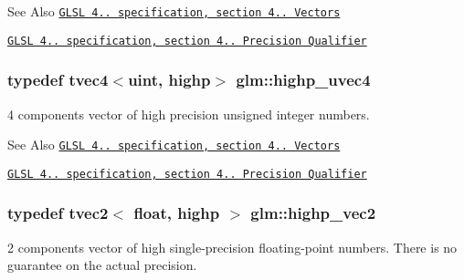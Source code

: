 \begin{DoxySeeAlso}{See Also}
\href{http://www.opengl.org/registry/doc/GLSLangSpec.4.20.8.pdf}{\tt G\-L\-S\-L 4.. specification, section 4.. Vectors} 

\href{http://www.opengl.org/registry/doc/GLSLangSpec.4.20.8.pdf}{\tt G\-L\-S\-L 4.. specification, section 4.. Precision Qualifier} 
\end{DoxySeeAlso}
\hypertarget{group__core__precision_gaced82ea2e726f079d4d72cf180a75b8b}{
\subsubsection[{highp\-\_\-uvec4}]{\setlength{\rightskip}{0pt plus 5cm}typedef tvec4$<$uint, highp$>$ {\bf glm\-::highp\-\_\-uvec4}}}\label{group__core__precision_gaced82ea2e726f079d4d72cf180a75b8b}
4 components vector of high precision unsigned integer numbers.

\begin{DoxySeeAlso}{See Also}
\href{http://www.opengl.org/registry/doc/GLSLangSpec.4.20.8.pdf}{\tt G\-L\-S\-L 4.. specification, section 4.. Vectors} 

\href{http://www.opengl.org/registry/doc/GLSLangSpec.4.20.8.pdf}{\tt G\-L\-S\-L 4.. specification, section 4.. Precision Qualifier} 
\end{DoxySeeAlso}
\hypertarget{group__core__precision_ga84532f0e0c7e2af99edd65dc182aba51}{
\subsubsection[{highp\-\_\-vec2}]{\setlength{\rightskip}{0pt plus 5cm}typedef tvec2$<$ float, highp $>$ {\bf glm\-::highp\-\_\-vec2}}}\label{group__core__precision_ga84532f0e0c7e2af99edd65dc182aba51}
2 components vector of high single-\/precision floating-\/point numbers. There is no guarantee on the actual precision.

